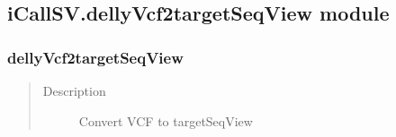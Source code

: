 \documentclass[letterpaper,10pt,english]{sphinxmanual}
\begin{document}
\subsection{iCallSV.dellyVcf2targetSeqView module}
\label{iCallSV:module-iCallSV.dellyVcf2targetSeqView}\label{iCallSV:icallsv-dellyvcf2targetseqview-module}

\subsubsection{dellyVcf2targetSeqView}
\label{iCallSV:dellyvcf2targetseqview}\begin{quote}\begin{description}
\item[{Description}] \leavevmode
Convert VCF to targetSeqView

\end{description}\end{quote}
\end{document}
